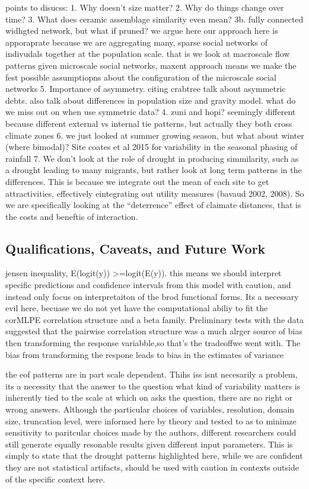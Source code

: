 \documentclass[10pt,letterpaper]{article}
\begin{document}
points to disucss: 1. Why doesn't size matter? 2. Why do things change
over time? 3. What does ceramic assemblage similarity even mean? 3b.
fully connected widhgted network, but what if pruned? we argue here our
approach here is apporaprate because we are aggregating many, sparse
social networks of indivudals together at the population scale. that is
we look at macroscale flow patterns given microscale social networks,
maxent approach means we make the fest possible assumptiopns about the
configuration of the microscale social networks 5. Importance of
asymmetry. citing crabtree talk about asymmetric debts. also talk about
differences in population size and gravity model. what do we miss out on
when use symmetric data? 4. zuni and hopi? seemingly different because
different external vs internal tie patterns, but actually they both
cross climate zones 6. we just looked at summer growing season, but what
about winter (where bimodal)? Site coates et al 2015 for variability in
the seasonal phasing of rainfall 7. We don't look at the role of drought
in producing simmilarity, such as a drought leading to many migrants,
but rather look at long term patterns in the differences. This is
because we integrate out the mean of each site to get attractivities,
effectively eintegrating out utility measures (bavaud 2002, 2008). So we
are specifically looking at the ``deterrence'' effect of claimate
distances, that is the costs and beneftis of interaction.

\subsection{Qualifications, Caveats, and Future
Work}\label{qualifications-caveats-and-future-work}

jensen inequality, E(logit(y)) \textgreater{}=logit(E(y)). this means we
should interpret specific predictions and confidence intervals from this
model with caution, and instead only focus on interpretaiton of the brod
functional forms. Its a necessary evil here, becuase we do not yet have
the computational abiliy to fit the corMLPE correlation structure and a
beta family. Preliminary tests with the data suggested that the pairwise
correlation structure was a much alrger source of bias then transforming
the response variabble,so that's the tradeoffwe went with. The bias from
transforming the respone leads to bias in the estimates of variance

the eof patterns are in part scale dependent. Thihs iss isnt necesarily
a problem, its a necessity that the answer to the question what kind of
variability matters is inherently tied to the scale at which on asks the
question, there are no right or wrong answers. Although the particular
choices of variables, resolution, domain size, truncation level, were
informed here by theory and tested to as to minimze sensitivity to
paritcular choices made by the authors, different researchers could
still generate equally resonable results given different input
parameters. This is simply to state that the drought patterns
highlighted here, while we are confident they are not statistical
artifacts, should be used with caution in contexts outside of the
specific context here.
\end{document}
